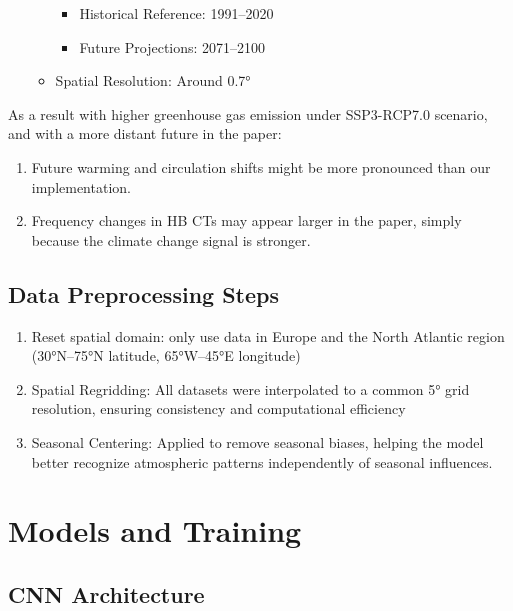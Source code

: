 \documentclass[
]{krantz}
\providecommand{\tightlist}{%
  \setlength{\itemsep}{0pt}\setlength{\parskip}{0pt}}
\begin{document}
\begin{enumerate}
\begin{itemize}
    \begin{itemize}
    \tightlist
    \item
      Historical Reference: 1991--2020
    \item
      Future Projections: 2071--2100
    \end{itemize}
  \item
    Spatial Resolution: Around 0.7°
  \end{itemize}
\end{enumerate}

As a result with higher greenhouse gas emission under SSP3-RCP7.0 scenario, and with a more distant future in the paper:

\begin{enumerate}
\def\labelenumi{\arabic{enumi}.}
\tightlist
\item
  Future warming and circulation shifts might be more pronounced than our implementation.
\item
  Frequency changes in HB CTs may appear larger in the paper, simply because the climate change signal is stronger.
\end{enumerate}

\subsection{Data Preprocessing Steps}\label{data-preprocessing-steps}

\begin{enumerate}
\def\labelenumi{\arabic{enumi}.}
\tightlist
\item
  Reset spatial domain: only use data in Europe and the North Atlantic region (30°N--75°N latitude, 65°W--45°E longitude)
\item
  Spatial Regridding: All datasets were interpolated to a common 5° grid resolution, ensuring consistency and computational efficiency
\item
  Seasonal Centering: Applied to remove seasonal biases, helping the model better recognize atmospheric patterns independently of seasonal influences.
\end{enumerate}

\section{Models and Training}\label{models-and-training}

\subsection{CNN Architecture}\label{cnn-architecture}
\end{document}
